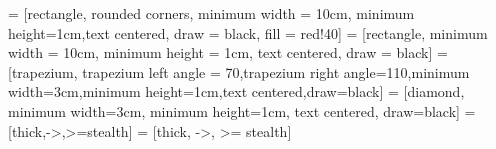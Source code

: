 \documentclass[12pt, a4paper, hyperref]{article}
\theoremstyle{newthm}
\begin{document}
\lhead{\rightmark} \chead{} \cfoot{} \rfoot{\thepage}
\renewcommand{\headrulewidth}{0.4pt}
\renewcommand{\footrulewidth}{0.4pt}


 = [rectangle, rounded corners, minimum width = 10cm, minimum height=1cm,text centered, draw = black, fill = red!40]
 = [rectangle, minimum width = 10cm, minimum height = 1cm, text centered, draw = black]
 = [trapezium, trapezium left angle = 70,trapezium right angle=110,minimum width=3cm,minimum height=1cm,text centered,draw=black]
 = [diamond, minimum width=3cm, minimum height=1cm, text centered, draw=black]
 = [thick,->,>=stealth]
 = [thick, ->, >= stealth]

\setlength{\headheight}{15pt}
\setlength{\droptitle}{-1.5cm}
\parindent=24pt
\setlength{\parskip}{0.3em}
\parindent=0pt
\pagestyle{fancy}


\end{document}
